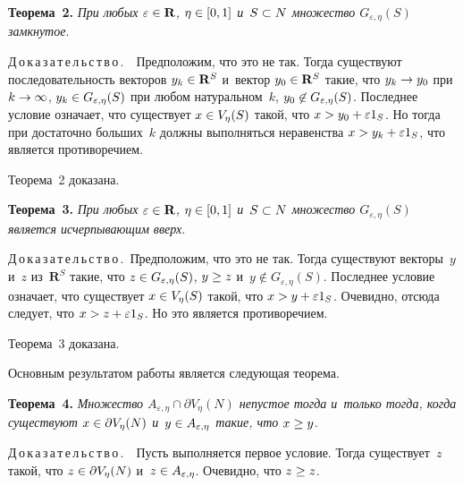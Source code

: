 \begin{multicols}{2}
     \smallskip
     
    \noindent
\textbf{Теорема~2.} \textit{При любых $\varepsilon\hm\in \mathbf{R}$,
$\eta\hm\in [0,1]$ и~$S\hm\subset N$ множество $G_{\varepsilon,\eta}(S)$ 
замкнутое}.
    

\smallskip

\noindent
Д\,о\,к\,а\,з\,а\,т\,е\,л\,ь\,с\,т\,в\,о\,.\ \  Предположим, что это не так. Тогда 
существуют последовательность векторов $y_k\hm\in \mathbf{R}^S$ и~вектор 
$y_0\hm\in \mathbf{R}^S$ такие, что $y_k\hm\to y_0$ при $k\hm\to \infty$, 
$y_k\hm\in G_{\varepsilon,\eta}(S)$ при любом натуральном~$k$, $y_0\hm\not\in 
G_{\varepsilon,\eta}(S)$. Последнее условие означает, что существует $x\hm\in 
V_\eta(S)$ такой, что $x\hm> y_0\hm+ \varepsilon 1_S$. Но тогда при достаточно 
больших~$k$ должны выполняться неравенства $x\hm> y_k\hm+ \varepsilon 
1_S$, что является противоречием.

    Теорема~2 доказана.

\smallskip

     
    \noindent
\textbf{Теорема~3.} \textit{При любых $\varepsilon\hm\in \mathbf{R}$, 
$\eta\hm\in [0,1]$ и~$S\hm\subset N$ множество $G_{\varepsilon,\eta}(S)$ 
является исчерпывающим вверх}.

\smallskip

\noindent
Д\,о\,к\,а\,з\,а\,т\,е\,л\,ь\,с\,т\,в\,о\,.\ \. Предположим, что это не так. Тогда 
существуют векторы~$y$ и~$z$ из~$\mathbf{R}^S$ такие, что $z\hm\in 
G_{\varepsilon,\eta}(S)$, $y\hm\geq z$ и~$y\not\in G_{\varepsilon,\eta}(S)$. 
Последнее условие означает, что существует $x\hm\in V_\eta(S)$ такой, что 
$x\hm> y\hm+ \varepsilon 1_S$. Очевидно, отсюда следует, что $x\hm> z\hm+ 
\varepsilon 1_S$. Но это является противоречием.

    Теорема~3 доказана. 

\smallskip

    Основным результатом работы является следующая теорема.

     \smallskip
     
    \noindent
\textbf{Теорема~4.} \textit{Множество $A_{\varepsilon,\eta}\cap \partial 
V_\eta(N)$ непустое тогда и~только тогда, когда существуют $x\hm\in \partial 
V_\eta(N)$ и~$y\hm\in A_{\varepsilon,\eta}$ такие, что $x\hm\geq y$}.

\smallskip

\noindent
Д\,о\,к\,а\,з\,а\,т\,е\,л\,ь\,с\,т\,в\,о\,.\ \  Пусть выполняется первое условие. Тогда 
существует~$z$ такой, что $z\hm\in \partial V_\eta(N)$ и~$z\hm\in 
A_{\varepsilon,\eta}$. Очевидно, что $z\hm\geq z$.


\end{multicols}

